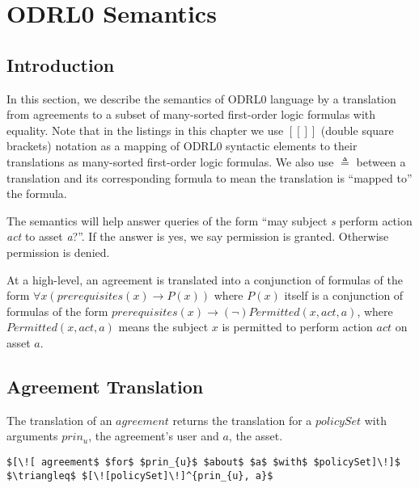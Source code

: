 \chapter{ODRL0 Semantics}\label{chap:semantics}

                  
\section{Introduction}\label{sec:introsemantics}


In this section, we describe the semantics of ODRL0 language by a translation from agreements to a subset of many-sorted first-order logic formulas with equality. Note that in the listings in this chapter we use $[\![]\!]$ (double square brackets) notation as a mapping of ODRL0 syntactic elements to their translations as many-sorted first-order logic formulas. We also use $\triangleq$ between a translation and its corresponding formula to mean the translation is ``mapped to'' the formula.

The semantics will help answer queries of the form ``may subject \emph{s} perform action \emph{act} to asset \emph{a}?''. If the answer is yes, we say permission is granted. Otherwise permission is denied. 


At a high-level, an agreement is translated into a conjunction of formulas of the form $\forall x ( prerequisites(x) \rightarrow P(x))$ where $P(x)$ itself is a conjunction of formulas of the form $ prerequisites(x) \rightarrow (\lnot) Permitted (x, act, a)$, where $Permitted (x, act, a)$ means the subject $x$ is permitted to perform action $act$ on asset $a$.

\section{Agreement Translation}
The translation of an $agreement$ returns the translation for a $policySet$ with arguments $prin_{u}$, the agreement's user and $a$, the asset.


\lstset{mathescape, language=AST}  
\begin{lstlisting}[frame=single, caption={Agreement Translation},label={lst:transAgreementast}]
$[\![ agreement$ $for$ $prin_{u}$ $about$ $a$ $with$ $policySet]\!]$ $\triangleq$ $[\![policySet]\!]^{prin_{u}, a}$
\end{lstlisting}

